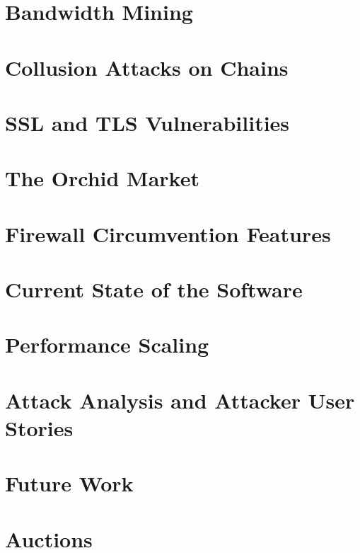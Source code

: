 \documentclass{article}
\newcommand{\orchid}{Orchid}
\newcommand{\Orchid}{\orchid}
\newcommand{\TOM}{The \Orchid{} Market}
\begin{document}
\section{Bandwidth Mining}
\label{sec:mining}


\section{Collusion Attacks on Chains}
\label{sec:collusion-attacks}


\section{SSL and TLS Vulnerabilities}


\section{\TOM{}}
\label{sec:agora}


\section{Firewall Circumvention Features}
\label{sec:evasion}


\section{Current State of the Software}
\label{sec:current}


\section{Performance Scaling}
\label{sec:performance}


\section{Attack Analysis and Attacker User Stories}
\label{sec:attack-stories}


\section{Future Work}
\label{sec:future}


\newpage

\printbibliography

\newpage

\appendix

\section{Auctions}
\label{sec:auctions}

\end{document}
